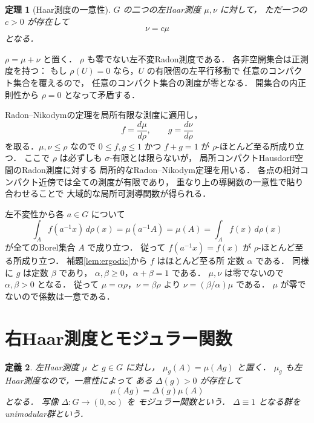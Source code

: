 \documentclass[a5paper,10pt,onecolumn]{jsarticle}
\makeatletter
\theoremstyle{mathnotetheorem}
\newtheorem{theorem}{定理}[section]
\newtheorem{definition}[theorem]{定義}
\renewcommand{\proofname}{証明}
\renewenvironment{proof}[1][\proofname]{%
  \par\pushQED{\qed}\normalfont\topsep4\p@\@plus2\p@\relax
  \trivlist\item[\hskip\labelsep\bfseries #1]\ignorespaces
}{\popQED\endtrivlist\@endpefalse}
\makeatother
\begin{document}
\begin{theorem}[Haar測度の一意性]\label{thm:haar-unique}
$G$ の二つの左Haar測度 $\mu,\nu$ に対して，
ただ一つの $c>0$ が存在して
\[
 \nu=c\mu
\]
となる．
\end{theorem}
\begin{proof}
$\rho=\mu+\nu$ と置く．
$\rho$ も零でない左不変Radon測度である．
各非空開集合は正測度を持つ：
もし $\rho(U)=0$ なら，$U$ の有限個の左平行移動で
任意のコンパクト集合を覆えるので，
任意のコンパクト集合の測度が零となる．
開集合の内正則性から $\rho=0$ となって矛盾する．

Radon--Nikodymの定理を局所有限な測度に適用し，
\[
 f=\frac{d\mu}{d\rho},\qquad
 g=\frac{d\nu}{d\rho}
\]
を取る．$\mu,\nu\le\rho$ なので
$0\le f,g\le1$ かつ $f+g=1$ が
$\rho$-ほとんど至る所成り立つ．
ここで $\rho$ は必ずしも $\sigma$-有限とは限らないが，
局所コンパクトHausdorff空間のRadon測度に対する
局所的なRadon--Nikodym定理を用いる．
各点の相対コンパクト近傍では全ての測度が有限であり，
重なり上の導関数の一意性で貼り合わせることで
大域的な局所可測導関数が得られる．

左不変性から各 $a\in G$ について
\[
 \int_A f(a^{-1}x)\,d\rho(x)
 =\mu(a^{-1}A)=\mu(A)
 =\int_Af(x)\,d\rho(x)
\]
が全てのBorel集合 $A$ で成り立つ．
従って $f(a^{-1}x)=f(x)$ が
$\rho$-ほとんど至る所成り立つ．
補題\ref{lem:ergodic}から $f$ はほとんど至る所
定数 $\alpha$ である．
同様に $g$ は定数 $\beta$ であり，
$\alpha,\beta\ge0$，$\alpha+\beta=1$ である．
$\mu,\nu$ は零でないので
$\alpha,\beta>0$ となる．
従って
$\mu=\alpha\rho$，$\nu=\beta\rho$ より
$\nu=(\beta/\alpha)\mu$ である．
$\mu$ が零でないので係数は一意である．
\end{proof}

\section{右Haar測度とモジュラー関数}

\begin{definition}
左Haar測度 $\mu$ と $g\in G$ に対し，
$\mu_g(A)=\mu(Ag)$ と置く．
$\mu_g$ も左Haar測度なので，一意性によって
ある $\Delta(g)>0$ が存在して
\[
 \mu(Ag)=\Delta(g)\mu(A)
\]
となる．
写像 $\Delta:G\to(0,\infty)$ を
\emph{モジュラー関数}という．
$\Delta\equiv1$ となる群をunimodular群という．
\end{definition}
\end{document}
